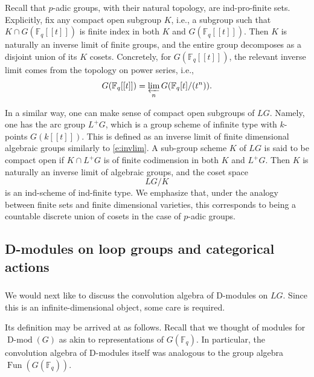 \documentclass[10pt]{amsart}
\newcommand{\on}{\operatorname}
\newcommand{\Dmod}{\on{D-mod}}
\newcommand{\Fq}{\mathbb{F}_q}
\newcommand{\Fun}{\on{Fun}}
\theoremstyle{remark}
\numberwithin{equation}{section}
\begin{document}
	
Recall that $p$-adic groups, with their natural topology, are ind-pro-finite 
sets. Explicitly, fix any compact open subgroup $K$, i.e., a subgroup such that $K \cap G(\Fq[[t]])$ is finite index in both $K$ and $G(\Fq[[t]])$. Then $K$ is 
naturally an inverse limit of finite groups, and the entire group decomposes as 
a disjoint union of its $K$ cosets. Concretely, for $G(\Fq[[t]])$, the 
relevant inverse limit comes from the topology on power series, i.e., 
%
\begin{equation}
\label{e:invlim}
      G(\Fq[[t]]) = \varprojlim_n G(\Fq[t]/(t^n)).
\end{equation}
%	
	
	
In a similar way, one can make sense of compact open subgroups of $LG$. Namely, 
one has the arc group $L^+G$, which is a group scheme of infinite type with 
$k$-points $G(k[[t]])$. This is defined as an inverse limit of finite dimensional 
algebraic groups similarly to \eqref{e:invlim}. A sub-group scheme $K$ 
of $LG$ is said to be compact open if $K \cap L^+G$ is of finite 
codimension in both $K$ and $L^+G$. Then $K$ is naturally an inverse limit of algebraic 
groups, and the coset space $$LG/K$$is an ind-scheme of ind-finite type. We 
emphasize that, under the analogy between finite sets 
and finite dimensional varieties, this corresponds to being a countable discrete union 
of 
cosets  in the case of $p$-adic groups. 

 
 
 \subsection{D-modules on loop groups and categorical actions}
 

	\subsubsection{} We would next like to discuss the convolution algebra of 
	D-modules on $LG$. Since this is an infinite-dimensional object, some care 
	is required. 
	
	Its definition may be arrived at as follows. Recall that we thought of 
	modules for $\Dmod(G)$ as akin to representations of $G(\Fq)$. In 
	particular, the convolution algebra of D-modules itself was analogous to 
	the group algebra $\Fun(G(\Fq))$. 
	
\end{document}
